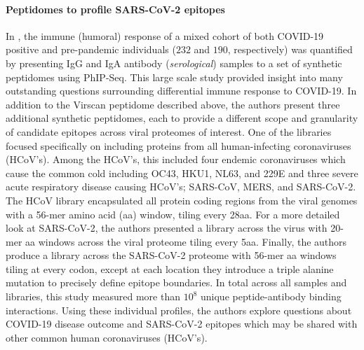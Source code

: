 \documentclass{article}
\begin{document}
\paragraph{Peptidomes to profile SARS-CoV-2 epitopes}
In \citet{Shrock2020}, the immune (humoral) response of a mixed cohort of both COVID-19 positive and pre-pandemic individuals ($232$ and $190$, respectively) was quantified by presenting IgG and IgA antibody (\textit{serological}) samples to a set of synthetic peptidomes using PhIP-Seq.
This large scale study provided insight into many outstanding questions surrounding differential immune response to COVID-19.
In addition to the Virscan peptidome described above, the authors present three additional synthetic peptidomes, each to provide a different scope and granularity of candidate epitopes across viral proteomes of interest.
One of the libraries focused specifically on including proteins from all human-infecting coronaviruses (HCoV's).
Among the HCoV's, this included four endemic coronaviruses which cause the common cold including OC43, HKU1, NL63, and 229E and three severe acute respiratory disease causing HCoV's; SARS-CoV, MERS, and SARS-CoV-2.
The HCoV library encapsulated all protein coding regions from the viral genomes with a 56-mer amino acid (aa) window, tiling every 28aa.
For a more detailed look at SARS-CoV-2, the authors presented a library across the virus with 20-mer aa windows across the viral proteome tiling every 5aa.
Finally, the authors produce a library across the SARS-CoV-2 proteome with 56-mer aa windows tiling at every codon, except at each location they introduce a triple alanine mutation to precisely define epitope boundaries.
In total across all samples and libraries, this study measured more than $10^{8}$ unique peptide-antibody binding interactions.
Using these individual profiles, the authors explore questions about COVID-19 disease outcome and SARS-CoV-2 epitopes which may be shared with other common human coronaviruses (HCoV's).

\end{document}
